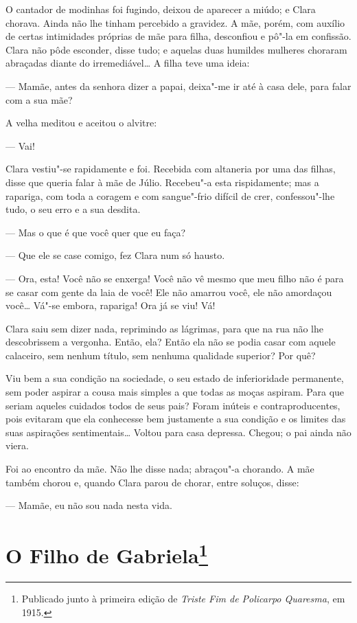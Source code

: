 O cantador de modinhas foi fugindo, deixou de aparecer a miúdo; e Clara
chorava. Ainda não lhe tinham percebido a gravidez. A mãe, porém, com
auxílio de certas intimidades próprias de mãe para filha, desconfiou e
pô"-la em confissão. Clara não pôde esconder, disse tudo; e aquelas duas
humildes mulheres choraram abraçadas diante do irremediável\ldots{} A filha
teve uma ideia:

--- Mamãe, antes da senhora dizer a papai, deixa"-me ir até à casa dele,
para falar com a sua mãe?

A velha meditou e aceitou o alvitre:

--- Vai!

Clara vestiu"-se rapidamente e foi. Recebida com altaneria por uma das
filhas, disse que queria falar à mãe de Júlio. Recebeu"-a esta
rispidamente; mas a rapariga, com toda a coragem e com sangue"-frio
difícil de crer, confessou"-lhe tudo, o seu erro e a sua desdita.

--- Mas o que é que você quer que eu faça?

--- Que ele se case comigo, fez Clara num só hausto.

--- Ora, esta! Você não se enxerga! Você não vê mesmo que meu filho não é
para se casar com gente da laia de você! Ele não amarrou você, ele não
amordaçou você\ldots{} Vá"-se embora, rapariga! Ora já se viu! Vá!

Clara saiu sem dizer nada, reprimindo as lágrimas, para que na rua não
lhe descobrissem a vergonha. Então, ela? Então ela não se podia casar
com aquele calaceiro, sem nenhum título, sem nenhuma qualidade superior?
Por quê?

Viu bem a sua condição na sociedade, o seu estado de inferioridade
permanente, sem poder aspirar a cousa mais simples a que todas as moças
aspiram. Para que seriam aqueles cuidados todos de seus pais? Foram
inúteis e contraproducentes, pois evitaram que ela conhecesse bem
justamente a sua condição e os limites das suas aspirações
sentimentais\ldots{} Voltou para casa depressa. Chegou; o pai ainda não
viera.

Foi ao encontro da mãe. Não lhe disse nada; abraçou"-a chorando. A mãe
também chorou e, quando Clara parou de chorar, entre soluços, disse:

--- Mamãe, eu não sou nada nesta vida.



\chapter[O Filho de Gabriela]{O Filho de Gabriela\footnote[*]{Publicado junto à primeira edição de \emph{Triste Fim de Policarpo Quaresma}, em 1915.}}

